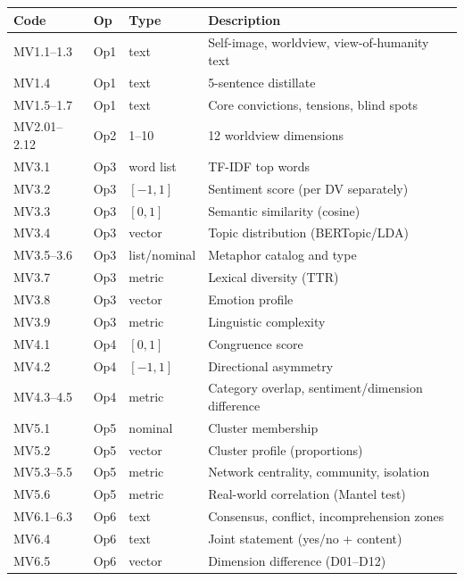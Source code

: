 \documentclass[11pt,a4paper]{article}
\theoremstyle{definition}
\theoremstyle{plain}
\theoremstyle{remark}
\begin{document}
\begin{longtable}{l l l p{6cm}}
  \toprule
  \textbf{Code} & \textbf{Op} & \textbf{Type} & \textbf{Description} \\
  \midrule
  \endhead
  MV1.1--1.3 & Op1 & text & Self-image, worldview, view-of-humanity text \\
  MV1.4 & Op1 & text & 5-sentence distillate \\
  MV1.5--1.7 & Op1 & text & Core convictions, tensions, blind spots \\
  \midrule
  MV2.01--2.12 & Op2 & 1--10 & 12 worldview dimensions \\
  \midrule
  MV3.1 & Op3 & word list & TF-IDF top words \\
  MV3.2 & Op3 & $[-1,1]$ & Sentiment score (per DV separately) \\
  MV3.3 & Op3 & $[0,1]$ & Semantic similarity (cosine) \\
  MV3.4 & Op3 & vector & Topic distribution (BERTopic/LDA) \\
  MV3.5--3.6 & Op3 & list/nominal & Metaphor catalog and type \\
  MV3.7 & Op3 & metric & Lexical diversity (TTR) \\
  MV3.8 & Op3 & vector & Emotion profile \\
  MV3.9 & Op3 & metric & Linguistic complexity \\
  \midrule
  MV4.1 & Op4 & $[0,1]$ & Congruence score \\
  MV4.2 & Op4 & $[-1,1]$ & Directional asymmetry \\
  MV4.3--4.5 & Op4 & metric & Category overlap, sentiment/dimension difference \\
  \midrule
  MV5.1 & Op5 & nominal & Cluster membership \\
  MV5.2 & Op5 & vector & Cluster profile (proportions) \\
  MV5.3--5.5 & Op5 & metric & Network centrality, community, isolation \\
  MV5.6 & Op5 & metric & Real-world correlation (Mantel test) \\
  \midrule
  MV6.1--6.3 & Op6 & text & Consensus, conflict, incomprehension zones \\
  MV6.4 & Op6 & text & Joint statement (yes/no + content) \\
  MV6.5 & Op6 & vector & Dimension difference (D01--D12) \\
  \bottomrule
\end{longtable}


\newpage
\end{document}
